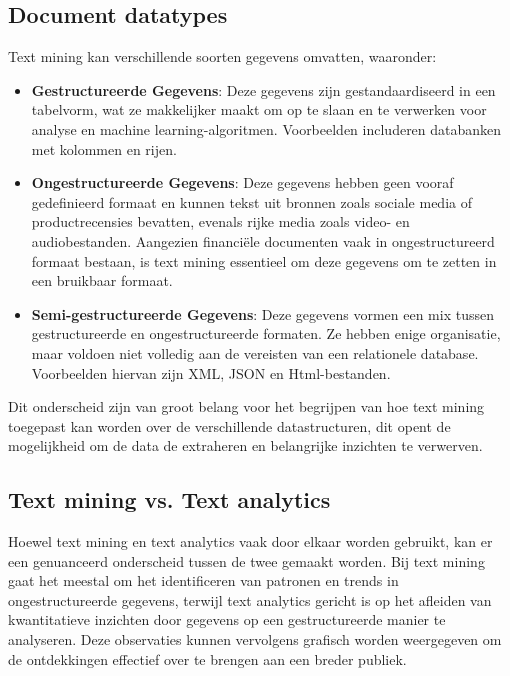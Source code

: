 \subsection{Document datatypes}
Text mining kan verschillende soorten gegevens omvatten, waaronder:

\begin{itemize}
  \item \textbf{Gestructureerde Gegevens}: Deze gegevens zijn gestandaardiseerd in een tabelvorm, wat ze makkelijker maakt om op te slaan en te verwerken voor analyse en machine learning-algoritmen. Voorbeelden includeren databanken met kolommen en rijen. %
  \item \textbf{Ongestructureerde Gegevens}: Deze gegevens hebben geen vooraf gedefinieerd formaat en kunnen tekst uit bronnen zoals sociale media of productrecensies bevatten, evenals rijke media zoals video- en audiobestanden. Aangezien financiële documenten vaak in ongestructureerd formaat bestaan, is text mining essentieel om deze gegevens om te zetten in een bruikbaar formaat.
  \item \textbf{Semi-gestructureerde Gegevens}: Deze gegevens vormen een mix tussen gestructureerde en ongestructureerde formaten. Ze hebben enige organisatie, maar voldoen niet volledig aan de vereisten van een relationele database. Voorbeelden hiervan zijn XML, JSON en Html-bestanden.
\end{itemize}

Dit onderscheid zijn van groot belang voor het begrijpen van hoe text mining toegepast kan worden over de verschillende datastructuren, dit opent de mogelijkheid om de data de extraheren en belangrijke inzichten te verwerven\autocite{AWS2024}.

\subsection{Text mining vs. Text analytics}
Hoewel text mining en text analytics vaak door elkaar worden gebruikt, kan er een genuanceerd onderscheid tussen de twee gemaakt worden. Bij text mining gaat het meestal om het identificeren van patronen en trends in ongestructureerde gegevens, terwijl text analytics gericht is op het afleiden van kwantitatieve inzichten door gegevens op een gestructureerde manier te analyseren. Deze observaties kunnen vervolgens grafisch worden weergegeven om de ontdekkingen effectief over te brengen aan een breder publiek.\autocite{IBM2024}
